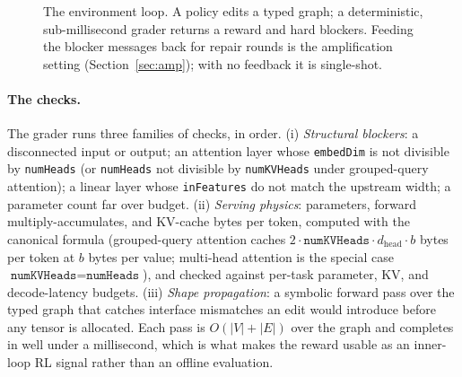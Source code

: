 \documentclass{article}
\begin{document}
\begin{figure}[t]
\centering
{}
\caption{The environment loop. A policy edits a typed graph; a deterministic, sub-millisecond grader returns a reward and hard blockers. Feeding the blocker messages back for repair rounds is the amplification setting (Section~\ref{sec:amp}); with no feedback it is single-shot.}
\label{fig:loop}
\end{figure}

\paragraph{The checks.} The grader runs three families of checks, in order. (i) \emph{Structural blockers}: a disconnected input or output; an attention layer whose \texttt{embedDim} is not divisible by \texttt{numHeads} (or \texttt{numHeads} not divisible by \texttt{numKVHeads} under grouped-query attention); a linear layer whose \texttt{inFeatures} do not match the upstream width; a parameter count far over budget. (ii) \emph{Serving physics}: parameters, forward multiply-accumulates, and KV-cache bytes per token, computed with the canonical formula (grouped-query attention caches $2\cdot\texttt{numKVHeads}\cdot d_{\text{head}}\cdot b$ bytes per token at $b$ bytes per value; multi-head attention is the special case $\texttt{numKVHeads}=\texttt{numHeads}$), and checked against per-task parameter, KV, and decode-latency budgets. (iii) \emph{Shape propagation}: a symbolic forward pass over the typed graph that catches interface mismatches an edit would introduce before any tensor is allocated. Each pass is $O(|V|+|E|)$ over the graph and completes in well under a millisecond, which is what makes the reward usable as an inner-loop RL signal rather than an offline evaluation.
\end{document}
